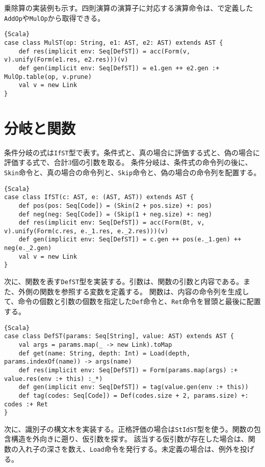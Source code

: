 \documentclass[10pt,a4paper]{book}
\begin{document}
乗除算の実装例も示す。四則演算の演算子に対応する演算命令は、で定義した\texttt{AddOp}や\texttt{MulOp}から取得できる。

\begin{Verbatim}{Scala}
case class MulST(op: String, e1: AST, e2: AST) extends AST {
	def res(implicit env: Seq[DefST]) = acc(Form(v, v).unify(Form(e1.res, e2.res)))(v)
	def gen(implicit env: Seq[DefST]) = e1.gen ++ e2.gen :+ MulOp.table(op, v.prune)
	val v = new Link
}
\end{Verbatim}

\section{分岐と関数\label{sect:CallST}}

条件分岐の式は\texttt{IfST}型で表す。条件式と、真の場合に評価する式と、偽の場合に評価する式で、合計3個の引数を取る。
条件分岐は、条件式の命令列の後に、\texttt{Skin}命令と、真の場合の命令列と、\texttt{Skip}命令と、偽の場合の命令列を配置する。

\begin{Verbatim}{Scala}
case class IfST(c: AST, e: (AST, AST)) extends AST {
	def pos(pos: Seq[Code]) = (Skin(2 + pos.size) +: pos)
	def neg(neg: Seq[Code]) = (Skip(1 + neg.size) +: neg)
	def res(implicit env: Seq[DefST]) = acc(Form(Bt, v, v).unify(Form(c.res, e._1.res, e._2.res)))(v)
	def gen(implicit env: Seq[DefST]) = c.gen ++ pos(e._1.gen) ++ neg(e._2.gen)
	val v = new Link
}
\end{Verbatim}

次に、関数を表す\texttt{DefST}型を実装する。引数は、関数の引数と内容である。また、外側の関数を参照する変数を定義する。
関数は、内容の命令列を生成して、命令の個数と引数の個数を指定した\texttt{Def}命令と、\texttt{Ret}命令を冒頭と最後に配置する。

\begin{Verbatim}{Scala}
case class DefST(params: Seq[String], value: AST) extends AST {
	val args = params.map(_ -> new Link).toMap
	def get(name: String, depth: Int) = Load(depth, params.indexOf(name)) -> args(name)
	def res(implicit env: Seq[DefST]) = Form(params.map(args) :+ value.res(env :+ this) :_*)
	def gen(implicit env: Seq[DefST]) = tag(value.gen(env :+ this))
	def tag(codes: Seq[Code]) = Def(codes.size + 2, params.size) +: codes :+ Ret
}
\end{Verbatim}

次に、識別子の構文木を実装する。正格評価の場合は\texttt{StIdST}型を使う。関数の包含構造を外向きに遡り、仮引数を探す。
該当する仮引数が存在した場合は、関数の入れ子の深さを数え、\texttt{Load}命令を発行する。未定義の場合は、例外を投げる。
\end{document}
